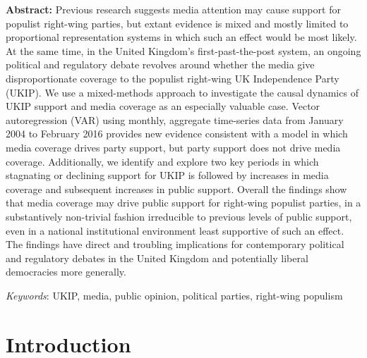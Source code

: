\documentclass[12pt,]{article}
\renewenvironment{abstract}
 {{%
    \setlength{\leftmargin}{0mm}
    \setlength{\rightmargin}{\leftmargin}%
    \footnotesize
  }%
  \relax}
 {\endlist}
\begin{document}
\begin{abstract}

    \hbox{\vrule height .2pt width 39.14pc}

    \vskip 8.5pt %

\noindent \footnotesize \textbf{Abstract:} Previous research suggests media attention may cause support for
populist right-wing parties, but extant evidence is mixed and mostly
limited to proportional representation systems in which such an effect
would be most likely. At the same time, in the United Kingdom's
first-past-the-post system, an ongoing political and regulatory debate
revolves around whether the media give disproportionate coverage to the
populist right-wing UK Independence Party (UKIP). We use a mixed-methods
approach to investigate the causal dynamics of UKIP support and media
coverage as an especially valuable case. Vector autoregression (VAR)
using monthly, aggregate time-series data from January 2004 to February
2016 provides new evidence consistent with a model in which media
coverage drives party support, but party support does not drive media
coverage. Additionally, we identify and explore two key periods in which
stagnating or declining support for UKIP is followed by increases in
media coverage and subsequent increases in public support. Overall the
findings show that media coverage may drive public support for
right-wing populist parties, in a substantively non-trivial fashion
irreducible to previous levels of public support, even in a national
institutional environment least supportive of such an effect. The
findings have direct and troubling implications for contemporary
political and regulatory debates in the United Kingdom and potentially
liberal democracies more generally.


\vskip 8.5pt \noindent \footnotesize \emph{Keywords}: UKIP, media, public opinion, political parties, right-wing populism \par

    \hbox{\vrule height .2pt width 40pc}



\end{abstract}


\vskip 6.5pt

\noindent  \section{Introduction}\label{introduction}
\end{document}
